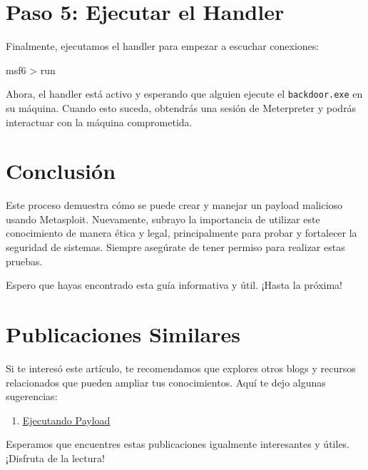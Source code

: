 \documentclass[
  jou,
  floatsintext,
  longtable,
  a4paper,
  nolmodern,
  notxfonts,
  notimes,
  12pt,
  colorlinks=true,linkcolor=blue,citecolor=blue,urlcolor=blue]{apa7}
\newenvironment{Shaded}{\begin{snugshade}}{\end{snugshade}}
\newcommand{\ExtensionTok}[1]{\textcolor[rgb]{0.00,0.23,0.31}{#1}}
\newcommand{\NormalTok}[1]{\textcolor[rgb]{0.00,0.23,0.31}{#1}}
\newcommand{\OperatorTok}[1]{\textcolor[rgb]{0.37,0.37,0.37}{#1}}
\providecommand{\tightlist}{%
  \setlength{\itemsep}{0pt}\setlength{\parskip}{0pt}}
\begin{document}
\section{Paso 5: Ejecutar el Handler}\label{paso-5-ejecutar-el-handler}

Finalmente, ejecutamos el handler para empezar a escuchar conexiones:

\begin{Shaded}
\begin{Highlighting}[]
\ExtensionTok{msf6} \OperatorTok{\textgreater{}}\NormalTok{ run}
\end{Highlighting}
\end{Shaded}

Ahora, el handler está activo y esperando que alguien ejecute el
\texttt{backdoor.exe} en su máquina. Cuando esto suceda, obtendrás una
sesión de Meterpreter y podrás interactuar con la máquina comprometida.

\section{Conclusión}\label{conclusiuxf3n}

Este proceso demuestra cómo se puede crear y manejar un payload
malicioso usando Metasploit. Nuevamente, subrayo la importancia de
utilizar este conocimiento de manera ética y legal, principalmente para
probar y fortalecer la seguridad de sistemas. Siempre asegúrate de tener
permiso para realizar estas pruebas.

Espero que hayas encontrado esta guía informativa y útil. ¡Hasta la
próxima!

\section{Publicaciones Similares}\label{publicaciones-similares}

Si te interesó este artículo, te recomendamos que explores otros blogs y
recursos relacionados que pueden ampliar tus conocimientos. Aquí te dejo
algunas sugerencias:

\begin{enumerate}
\def\labelenumi{\arabic{enumi}.}
\tightlist
\item
  \href{https://chaska-x.netlify.app/ciberseguridad-ethical-hacking-ceh/2024-09-03-ejecutando-payload/index.pdf}{}
  \href{https://chaska-x.netlify.app/ciberseguridad-ethical-hacking-ceh/2024-09-03-ejecutando-payload}{Ejecutando
  Payload}
\end{enumerate}

Esperamos que encuentres estas publicaciones igualmente interesantes y
útiles. ¡Disfruta de la lectura!
\end{document}

